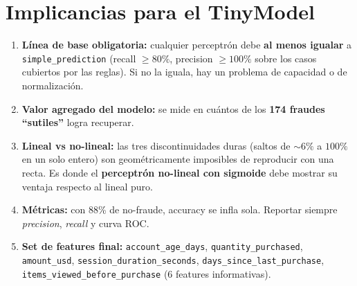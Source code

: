 \documentclass[11pt,a4paper]{article}
\begin{document}
\section{Implicancias para el TinyModel}

\begin{takeaway}
\begin{enumerate}[leftmargin=*, itemsep=3pt, topsep=2pt]
    \item \textbf{L\'inea de base obligatoria:} cualquier perceptr\'on debe
          \textbf{al menos igualar} a \texttt{simple\_prediction} (recall $\geq 80\%$,
          precision $\geq 100\%$ sobre los casos cubiertos por las reglas).
          Si no la iguala, hay un problema de capacidad o de normalizaci\'on.
    \item \textbf{Valor agregado del modelo:} se mide en cu\'antos de los \textbf{174 fraudes
          ``sutiles''} logra recuperar.
    \item \textbf{Lineal vs no-lineal:} las tres discontinuidades duras (saltos de
          $\sim 6\%$ a $100\%$ en un solo entero) son geom\'etricamente imposibles
          de reproducir con una recta. Es donde el \textbf{perceptr\'on no-lineal con
          sigmoide} debe mostrar su ventaja respecto al lineal puro.
    \item \textbf{M\'etricas:} con 88\% de no-fraude, accuracy se infla sola.
          Reportar siempre \emph{precision}, \emph{recall} y curva ROC.
    \item \textbf{Set de features final:} \texttt{account\_age\_days},
          \texttt{quantity\_purchased}, \texttt{amount\_usd},
          \texttt{session\_duration\_seconds}, \texttt{days\_since\_last\_purchase},
          \texttt{items\_viewed\_before\_purchase} (6 features informativas).
\end{enumerate}
\end{takeaway}
\end{document}
